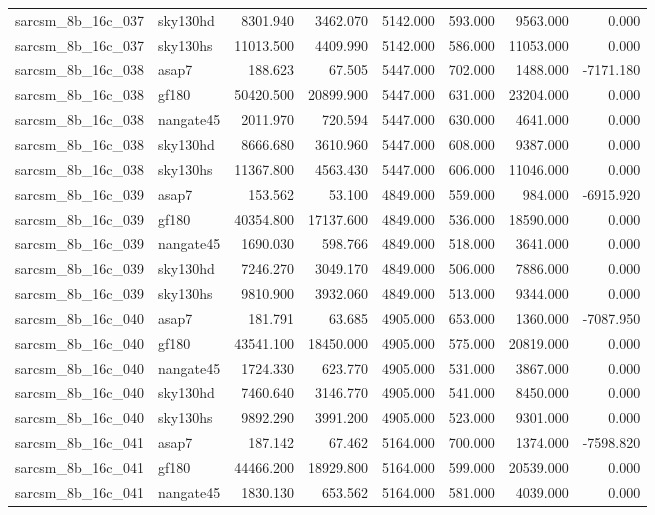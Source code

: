 \begin{tabular}{llrrrrrr}
sarcsm\_8b\_16c\_037 & sky130hd & 8301.940 & 3462.070 & 5142.000 & 593.000 & 9563.000 & 0.000 \\
sarcsm\_8b\_16c\_037 & sky130hs & 11013.500 & 4409.990 & 5142.000 & 586.000 & 11053.000 & 0.000 \\
sarcsm\_8b\_16c\_038 & asap7 & 188.623 & 67.505 & 5447.000 & 702.000 & 1488.000 & -7171.180 \\
sarcsm\_8b\_16c\_038 & gf180 & 50420.500 & 20899.900 & 5447.000 & 631.000 & 23204.000 & 0.000 \\
sarcsm\_8b\_16c\_038 & nangate45 & 2011.970 & 720.594 & 5447.000 & 630.000 & 4641.000 & 0.000 \\
sarcsm\_8b\_16c\_038 & sky130hd & 8666.680 & 3610.960 & 5447.000 & 608.000 & 9387.000 & 0.000 \\
sarcsm\_8b\_16c\_038 & sky130hs & 11367.800 & 4563.430 & 5447.000 & 606.000 & 11046.000 & 0.000 \\
sarcsm\_8b\_16c\_039 & asap7 & 153.562 & 53.100 & 4849.000 & 559.000 & 984.000 & -6915.920 \\
sarcsm\_8b\_16c\_039 & gf180 & 40354.800 & 17137.600 & 4849.000 & 536.000 & 18590.000 & 0.000 \\
sarcsm\_8b\_16c\_039 & nangate45 & 1690.030 & 598.766 & 4849.000 & 518.000 & 3641.000 & 0.000 \\
sarcsm\_8b\_16c\_039 & sky130hd & 7246.270 & 3049.170 & 4849.000 & 506.000 & 7886.000 & 0.000 \\
sarcsm\_8b\_16c\_039 & sky130hs & 9810.900 & 3932.060 & 4849.000 & 513.000 & 9344.000 & 0.000 \\
sarcsm\_8b\_16c\_040 & asap7 & 181.791 & 63.685 & 4905.000 & 653.000 & 1360.000 & -7087.950 \\
sarcsm\_8b\_16c\_040 & gf180 & 43541.100 & 18450.000 & 4905.000 & 575.000 & 20819.000 & 0.000 \\
sarcsm\_8b\_16c\_040 & nangate45 & 1724.330 & 623.770 & 4905.000 & 531.000 & 3867.000 & 0.000 \\
sarcsm\_8b\_16c\_040 & sky130hd & 7460.640 & 3146.770 & 4905.000 & 541.000 & 8450.000 & 0.000 \\
sarcsm\_8b\_16c\_040 & sky130hs & 9892.290 & 3991.200 & 4905.000 & 523.000 & 9301.000 & 0.000 \\
sarcsm\_8b\_16c\_041 & asap7 & 187.142 & 67.462 & 5164.000 & 700.000 & 1374.000 & -7598.820 \\
sarcsm\_8b\_16c\_041 & gf180 & 44466.200 & 18929.800 & 5164.000 & 599.000 & 20539.000 & 0.000 \\
sarcsm\_8b\_16c\_041 & nangate45 & 1830.130 & 653.562 & 5164.000 & 581.000 & 4039.000 & 0.000 \\

\end{tabular}
